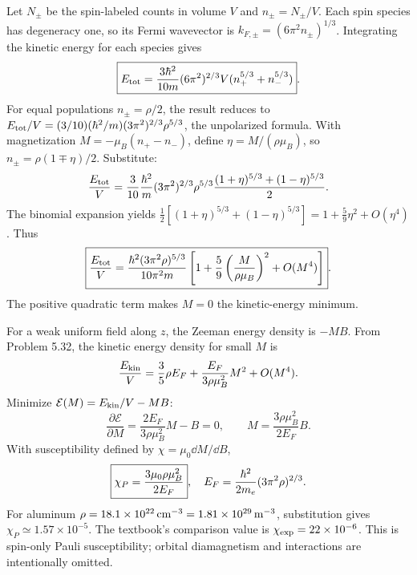 Let $N_\pm$ be the spin-labeled counts
in volume $V$ and $n_\pm=N_\pm/V$.
Each spin species has degeneracy one,
so its Fermi wavevector is
$k_{F,\pm}=(6\pi^2n_\pm)^{1/3}$.
Integrating the kinetic energy for
each species gives
\begin{equation}
\boxed{E_{\rm tot}=
\frac{3\hbar^2}{10m}(6\pi^2)^{2/3}
V(n_+^{5/3}+n_-^{5/3})}.
\end{equation}
For equal populations $n_\pm=\rho/2$,
the result reduces to
$E_{\rm tot}/V=
(3/10)(\hbar^2/m)(3\pi^2)^{2/3}
\rho^{5/3}$, the unpolarized formula.
With magnetization
$M=-\mu_B(n_+-n_-)$,
define $\eta=M/(\rho\mu_B)$, so
$n_\pm=\rho(1\mp\eta)/2$.
Substitute:
\begin{equation}
\frac{E_{\rm tot}}V=
\frac{3}{10}\frac{\hbar^2}{m}
(3\pi^2)^{2/3}\rho^{5/3}
\frac{(1+\eta)^{5/3}+
(1-\eta)^{5/3}}2.
\end{equation}
The binomial expansion yields
$\frac12[(1+\eta)^{5/3}+
(1-\eta)^{5/3}]=
1+\frac59\eta^2+O(\eta^4)$.
Thus
\begin{equation}
\boxed{\frac{E_{\rm tot}}V=
\frac{\hbar^2(3\pi^2\rho)^{5/3}}
{10\pi^2m}
\left[1+\frac59
\left(\frac{M}{\rho\mu_B}\right)^2
+O(M^4)\right]}.
\end{equation}
The positive quadratic term makes
$M=0$ the kinetic-energy minimum.

For a weak uniform field along $z$,
the Zeeman energy density is $-MB$.
From Problem 5.32, the kinetic
energy density for small $M$ is
\begin{equation}
\frac{E_{\rm kin}}V
=\frac35\rho E_F+
\frac{E_F}{3\rho\mu_B^2}M^2+O(M^4).
\end{equation}
Minimize
$\mathcal E(M)=E_{\rm kin}/V-MB$:
\begin{equation}
\frac{\partial\mathcal E}{\partial M}
=\frac{2E_F}{3\rho\mu_B^2}M-B=0,
\qquad
\boxed{M=\frac{3\rho\mu_B^2}{2E_F}B}.
\end{equation}
With susceptibility defined by
$\chi=\mu_0\dd M/\dd B$,
\begin{equation}
\boxed{\chi_P=
\frac{3\mu_0\rho\mu_B^2}{2E_F}},
\quad
E_F=\frac{\hbar^2}{2m_e}(3\pi^2\rho)^{2/3}.
\end{equation}
For aluminum $\rho=18.1\times10^{22}
\,{\rm cm^{-3}}=1.81\times10^{29}\,{\rm m^{-3}}$,
substitution gives
$\boxed{\chi_P\simeq1.57\times10^{-5}}$.
The textbook's comparison value is
$\chi_{\rm exp}=22\times10^{-6}$.
This is spin-only Pauli susceptibility;
orbital diamagnetism and interactions
are intentionally omitted.

